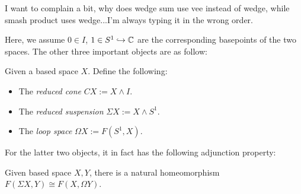\documentclass{article}
\begin{document}
I want to complain a bit, why does wedge sum use vee instead of wedge, while smash product uses wedge...I'm always typing it in the wrong order.

Here, we assume $0\in I$, $1\in S^1\hookrightarrow \mathbb{C}$ are the corresponding basepoints of the two spaces. The other three important objects are as follow:
\begin{defn}
    Given a based space $X$. Define the following:
    \begin{itemize}
        \item The \emph{reduced cone} $CX:= X\wedge I$.
        \item The \emph{reduced suspension} $\Sigma X:= X\wedge S^1$.
        \item The \emph{loop space} $\Omega X:= F(S^1,X)$.
    \end{itemize}
\end{defn}
For the latter two objects, it in fact has the following adjunction property:
\begin{prop}
    Given based space $X,Y$, there is a natural homeomorphism $F(\Sigma X,Y)\cong F(X,\Omega Y)$.
\end{prop}
\end{document}
